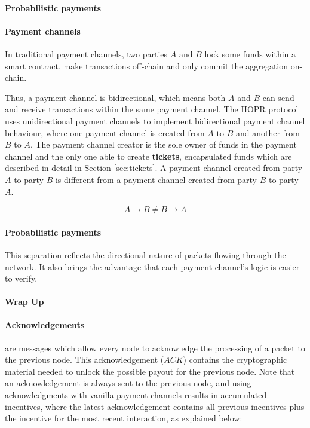 \paragraph{Probabilistic payments}

\paragraph{Payment channels}

In traditional payment channels, two parties $A$ and $B$ lock some funds within a smart contract, make transactions off-chain and only commit the aggregation on-chain.



Thus, a payment channel is bidirectional, which means both $A$ and $B$ can send and receive transactions within the same payment channel. The HOPR protocol uses unidirectional payment channels to implement bidirectional payment channel behaviour, where one payment channel is created from $A$ to $B$ and another from $B$ to $A$. The payment channel creator is the sole owner of funds in the payment channel and the only one able to create \textbf{tickets}, encapsulated funds which are described in detail in Section \ref{sec:tickets}. A payment channel created from party $A$ to party $B$ is different from a payment channel created from party $B$ to party $A$.

$$A\rightarrow B \neq B\rightarrow A$$

\paragraph{Probabilistic payments}

This separation reflects the directional nature of packets flowing through the network. It also brings the advantage that each payment channel's logic is easier to verify.

\paragraph{Wrap Up}

\paragraph{Acknowledgements} are messages which allow every node to acknowledge the processing of a packet to the previous node. This acknowledgement ($ACK$) contains the cryptographic material needed to unlock the possible payout for the previous node. Note that an acknowledgement is always sent to the previous node, and using acknowledgments with vanilla payment channels results in accumulated incentives, where the latest acknowledgement contains all previous incentives plus the incentive for the most recent interaction, as explained below:

